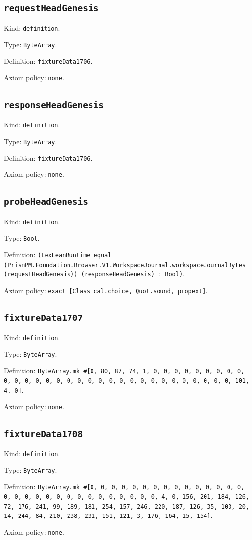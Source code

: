 \documentclass[11pt]{article}
\begin{document}
\subsection*{\texttt{requestHeadGenesis}}
\noindent Kind: \texttt{definition}.\par
\noindent Type: \texttt{ByteArray}.\par
\noindent Definition: \texttt{fixtureData1706}.\par
\noindent Axiom policy: \texttt{none}.\par
\subsection*{\texttt{responseHeadGenesis}}
\noindent Kind: \texttt{definition}.\par
\noindent Type: \texttt{ByteArray}.\par
\noindent Definition: \texttt{fixtureData1706}.\par
\noindent Axiom policy: \texttt{none}.\par
\subsection*{\texttt{probeHeadGenesis}}
\noindent Kind: \texttt{definition}.\par
\noindent Type: \texttt{Bool}.\par
\noindent Definition: \texttt{(LexLeanRuntime.equal (PrismPM.Foundation.Browser.V1.WorkspaceJournal.workspaceJournalBytes (requestHeadGenesis)) (responseHeadGenesis) : Bool)}.\par
\noindent Axiom policy: \texttt{exact [Classical.choice, Quot.sound, propext]}.\par
\subsection*{\texttt{fixtureData1707}}
\noindent Kind: \texttt{definition}.\par
\noindent Type: \texttt{ByteArray}.\par
\noindent Definition: \texttt{ByteArray.mk \#[0, 80, 87, 74, 1, 0, 0, 0, 0, 0, 0, 0, 0, 0, 0, 0, 0, 0, 0, 0, 0, 0, 0, 0, 0, 0, 0, 0, 0, 0, 0, 0, 0, 0, 0, 0, 101, 4, 0]}.\par
\noindent Axiom policy: \texttt{none}.\par
\subsection*{\texttt{fixtureData1708}}
\noindent Kind: \texttt{definition}.\par
\noindent Type: \texttt{ByteArray}.\par
\noindent Definition: \texttt{ByteArray.mk \#[0, 0, 0, 0, 0, 0, 0, 0, 0, 0, 0, 0, 0, 0, 0, 0, 0, 0, 0, 0, 0, 0, 0, 0, 0, 0, 0, 0, 0, 0, 4, 0, 156, 201, 184, 126, 72, 176, 241, 99, 189, 181, 254, 157, 246, 220, 187, 126, 35, 103, 20, 14, 244, 84, 210, 238, 231, 151, 121, 3, 176, 164, 15, 154]}.\par
\noindent Axiom policy: \texttt{none}.\par
\end{document}
